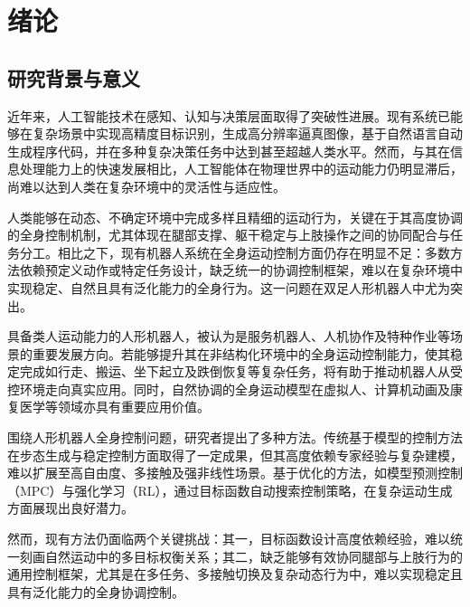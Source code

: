 \chapter{绪论}
\section{研究背景与意义}

近年来，人工智能技术在感知、认知与决策层面取得了突破性进展。现有系统已能够在复杂场景中实现高精度目标识别\cite{russakovsky2015imagenet}，生成高分辨率逼真图像\cite{brock2018large,karras2019style}，基于自然语言自动生成程序代码\cite{brown2020language,chen2021evaluating}，并在多种复杂决策任务中达到甚至超越人类水平\cite{berner2019dota,arulkumaran2019alphastar,silver2016mastering}。然而，与其在信息处理能力上的快速发展相比，人工智能体在物理世界中的运动能力仍明显滞后，尚难以达到人类在复杂环境中的灵活性与适应性。

人类能够在动态、不确定环境中完成多样且精细的运动行为，关键在于其高度协调的全身控制机制，尤其体现在腿部支撑、躯干稳定与上肢操作之间的协同配合与任务分工。相比之下，现有机器人系统在全身运动控制方面仍存在明显不足：多数方法依赖预定义动作或特定任务设计，缺乏统一的协调控制框架，难以在复杂环境中实现稳定、自然且具有泛化能力的全身行为。这一问题在双足人形机器人中尤为突出。

具备类人运动能力的人形机器人，被认为是服务机器人、人机协作及特种作业等场景的重要发展方向。若能够提升其在非结构化环境中的全身运动控制能力，使其稳定完成如行走、搬运、坐下起立及跌倒恢复等复杂任务，将有助于推动机器人从受控环境走向真实应用。同时，自然协调的全身运动模型在虚拟人、计算机动画及康复医学等领域亦具有重要应用价值。

围绕人形机器人全身控制问题，研究者提出了多种方法。传统基于模型的控制方法在步态生成与稳定控制方面取得了一定成果\cite{raibert2012hopping,mcgeer1990passive,raibert1991animation,schwind1998spring,geyer2003positive,vukobratovic2004zero,yin2007simbicon,da2008simulation,bledt2018cheetah}，但其高度依赖专家经验与复杂建模，难以扩展至高自由度、多接触及强非线性场景。基于优化的方法，如模型预测控制（MPC）与强化学习（RL），通过目标函数自动搜索控制策略，在复杂运动生成方面展现出良好潜力\cite{de2010feature,sreenath2011compliant,mordatch2012discovery,gehring2016practice,haarnoja2018learning,hwangbo2019learning}。


然而，现有方法仍面临两个关键挑战：其一，目标函数设计高度依赖经验，难以统一刻画自然运动中的多目标权衡关系；其二，缺乏能够有效协同腿部与上肢行为的通用控制框架，尤其是在多任务、多接触切换及复杂动态行为中，难以实现稳定且具有泛化能力的全身协调控制。

